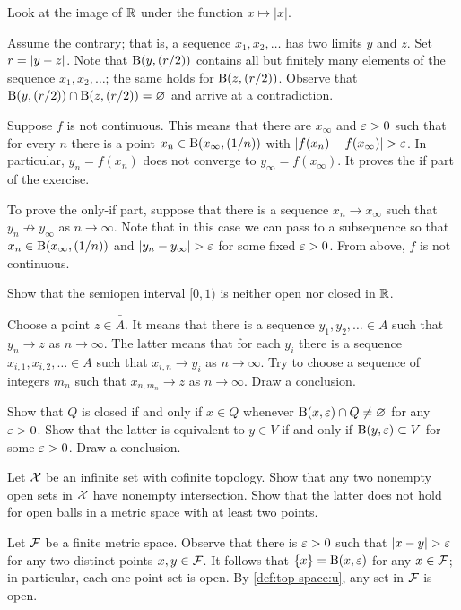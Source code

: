 Look at the image of $\mathbb{R}$ under the function $x\mapsto |x|$.

Assume the contrary; that is, a sequence $x_1,x_2,\ldots$ has two limits $y$ and $z$.
Set $r\z=|y-z|$.
Note that $\mathrm{B}(y,(r/2))$ contains all but finitely many elements of the sequence $x_1,x_2,\ldots$;
the same holds for $\mathrm{B}(z,(r/2))$.
Observe that $\Ball(y,\tfrac r2)\z\cap \Ball(z,\tfrac r2)=\emptyset$ and arrive at a contradiction.

Suppose $f$ is not continuous.
This means that there are $x_\infty$ and $\varepsilon>0$ such that for every $n$ there is a point $x_n\in \mathrm{B}(x_\infty,(1/n))$ with $|f(x_n)-f(x_\infty)|>\eps$.
In particular, $y_n=f(x_n)$ does not converge to $y_\infty=f(x_\infty)$.
It proves the if part of the exercise.

To prove the only-if part, suppose that there is a sequence $x_n\to x_\infty$ such that $y_n\not\to y_\infty$ as $n\to \infty$.
Note that in this case we can pass to a subsequence so that $x_n\in \mathrm{B}(x_\infty,(1/n))$ and $|y_n-y_\infty|>\eps$ for some fixed $\varepsilon>0$.
From above, $f$ is not continuous.

Show that the semiopen interval $[0,1)$ is neither open nor closed in $\mathbb{R}$.

Choose a point $z\in \bar{\bar A}$.
It means that there is a sequence $y_1,y_2,\ldots\in\bar A$ such that $y_n\to z$ as $n\to\infty$.
The latter means that for each $y_i$ there is a sequence $x_{i,1}, x_{i,2},\ldots\in A$ such that $x_{i,n}\to y_i$ as $n\to\infty$.
Try to choose a sequence of integers $m_n$ such that $x_{n,m_n}\to z$ as $n\to\infty$.
Draw a conclusion.

Show that $Q$ is closed if and only if $x\in Q$ whenever $\mathrm{B}(x,\varepsilon)\cap Q\ne\varnothing$ for any $\varepsilon>0$.
Show that the latter is equivalent to $y\in V$ if and only if $\mathrm{B}(y,\varepsilon)\subset V$ for some $\varepsilon>0$.
Draw a conclusion.

Let $\mathcal{X}$ be an infinite set with cofinite topology.
Show that any two nonempty open sets in $\mathcal{X}$ have nonempty intersection.
Show that the latter does not hold for open balls in a metric space with at least two points.


Let $\mathcal{F}$ be a finite metric space.
Observe that there is $\varepsilon>0$ such that $|x-y|>\eps$ for any two distinct points $x,y\in\mathcal{F}$.
It follows that $\{x\}=\mathrm{B}(x,\varepsilon)$ for any $x\in\mathcal{F}$;
in particular, each one-point set is open.
By \ref{def:top-space:u}, any set in $\mathcal{F}$ is open.

